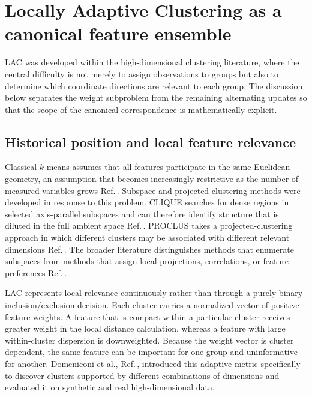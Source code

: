 \documentclass[11pt,a4paper]{article}
\theoremstyle{definition}
\theoremstyle{plain}
\begin{document}
\section{Locally Adaptive Clustering as a canonical feature ensemble}
\label{sec:lac}

LAC was developed within the high-dimensional clustering literature, where the central difficulty is not merely to assign observations to groups but also to determine which coordinate directions are relevant to each group. The discussion below separates the weight subproblem from the remaining alternating updates so that the scope of the canonical correspondence is mathematically explicit.

\subsection{Historical position and local feature relevance}
\label{subsec:lac_history}

Classical $k$-means assumes that all features participate in the same Euclidean geometry, an assumption that becomes increasingly restrictive as the number of measured variables grows Ref.\,\cite{macqueen1967,jain2010clustering}. Subspace and projected clustering methods were developed in response to this problem. CLIQUE searches for dense regions in selected axis-parallel subspaces and can therefore identify structure that is diluted in the full ambient space Ref.\,\cite{agrawal1998clique}. PROCLUS takes a projected-clustering approach in which different clusters may be associated with different relevant dimensions Ref.\,\cite{aggarwal1999proclus}. The broader literature distinguishes methods that enumerate subspaces from methods that assign local projections, correlations, or feature preferences Ref.\,\cite{kriegel2009survey}.

LAC represents local relevance continuously rather than through a purely binary inclusion/exclusion decision. Each cluster carries a normalized vector of positive feature weights. A feature that is compact within a particular cluster receives greater weight in the local distance calculation, whereas a feature with large within-cluster dispersion is downweighted. Because the weight vector is cluster dependent, the same feature can be important for one group and uninformative for another. Domeniconi et al., Ref.\,\cite{domeniconi2007lac}, introduced this adaptive metric specifically to discover clusters supported by different combinations of dimensions and evaluated it on synthetic and real high-dimensional data.
\end{document}
